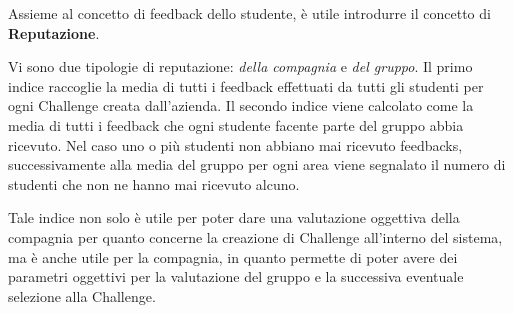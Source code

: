 Assieme al concetto di feedback dello studente, è utile introdurre il concetto di \textbf{Reputazione}.

Vi sono due tipologie di reputazione: \textit{della compagnia} e \textit{del gruppo}. Il primo indice raccoglie la media di tutti i feedback effettuati da tutti gli studenti per ogni Challenge creata dall'azienda. Il secondo indice viene calcolato come la media di tutti i feedback che ogni studente facente parte del gruppo abbia ricevuto. Nel caso uno o più studenti non abbiano mai ricevuto feedbacks, successivamente alla media del gruppo per ogni area viene segnalato il numero di studenti che non ne hanno mai ricevuto alcuno. 


Tale indice non solo è utile per poter dare una valutazione oggettiva della compagnia per quanto concerne la creazione di Challenge all'interno del sistema, ma è anche utile per la compagnia, in quanto permette di poter avere dei parametri oggettivi per la valutazione del gruppo e la successiva eventuale selezione alla Challenge.



\clearpage
